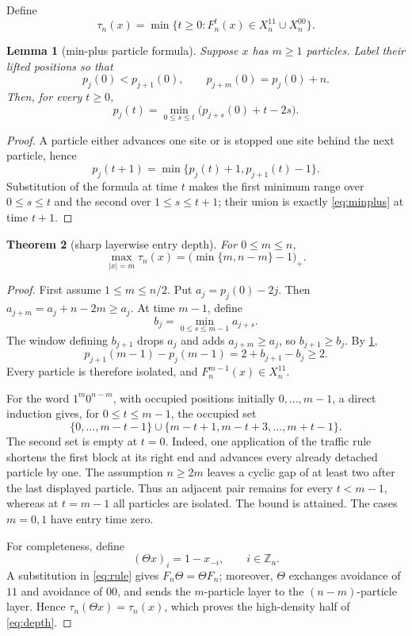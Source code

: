 \documentclass[11pt,a4paper]{amsart}
\newtheorem{theorem}{Theorem}[section]
\newtheorem{lemma}[theorem]{Lemma}
\theoremstyle{definition}
\theoremstyle{remark}
\newcommand{\Z}{\mathbb Z}
\newcommand{\1}{\mathbf 1}
\begin{document}
Define
\[
 \tau_n(x)=\min\{t\geq0:F_n^t(x)\in X_n^{11}\cup X_n^{00}\}.
\]

\begin{lemma}[min-plus particle formula]\label{lem:minplus}
Suppose $x$ has $m\geq1$ particles.  Label their lifted positions so that
\[
 p_j(0)<p_{j+1}(0),\qquad p_{j+m}(0)=p_j(0)+n.
\]
Then, for every $t\geq0$,
\begin{equation}\label{eq:minplus}
 p_j(t)=\min_{0\leq s\leq t}
 \bigl(p_{j+s}(0)+t-2s\bigr).
\end{equation}
\end{lemma}

\begin{proof}
A particle either advances one site or is stopped one site behind the next
particle, hence
\[
 p_j(t+1)=\min\{p_j(t)+1,p_{j+1}(t)-1\}.
\]
Substitution of the formula at time $t$ makes the first minimum range over
$0\leq s\leq t$ and the second over $1\leq s\leq t+1$; their union is exactly
\eqref{eq:minplus} at time $t+1$.
\end{proof}

\begin{theorem}[sharp layerwise entry depth]\label{thm:depth}
For $0\leq m\leq n$,
\begin{equation}\label{eq:depth}
 \max_{|x|=m}\tau_n(x)
 =\bigl(\min\{m,n-m\}-1\bigr)_+.
\end{equation}
\end{theorem}

\begin{proof}
First assume $1\leq m\leq n/2$.  Put
$a_j=p_j(0)-2j$.  Then
$a_{j+m}=a_j+n-2m\geq a_j$.  At time $m-1$, define
\[
 b_j=\min_{0\leq s\leq m-1}a_{j+s}.
\]
The window defining $b_{j+1}$ drops $a_j$ and adds
$a_{j+m}\geq a_j$, so $b_{j+1}\geq b_j$.  By
\cref{lem:minplus},
\[
 p_{j+1}(m-1)-p_j(m-1)=2+b_{j+1}-b_j\geq2.
\]
Every particle is therefore isolated, and $F_n^{m-1}(x)\in X_n^{11}$.

For the word $1^m0^{n-m}$, with occupied positions initially
$0,\ldots,m-1$, a direct induction gives, for $0\leq t\leq m-1$, the occupied
set
\begin{equation}\label{eq:witness-evolution}
 \{0,\ldots,m-t-1\}
 \cup\{m-t+1,m-t+3,\ldots,m+t-1\}.
\end{equation}
The second set is empty at $t=0$.  Indeed, one application of the traffic
rule shortens the first block at its right end and advances every already
detached particle by one.  The assumption $n\geq2m$ leaves a cyclic gap of
at least two after the last displayed particle.  Thus an adjacent pair
remains for every $t<m-1$, whereas at $t=m-1$ all particles are isolated.
The bound is attained.  The cases $m=0,1$ have entry time zero.

For completeness, define
\[
 (\Theta x)_i=1-x_{-i},\qquad i\in\Z_n.
\]
A substitution in \eqref{eq:rule} gives $F_n\Theta=\Theta F_n$; moreover,
$\Theta$ exchanges avoidance of $11$ and avoidance of $00$, and sends the
$m$-particle layer to the $(n-m)$-particle layer.  Hence
$\tau_n(\Theta x)=\tau_n(x)$, which proves the high-density half of
\eqref{eq:depth}.
\end{proof}
\end{document}
